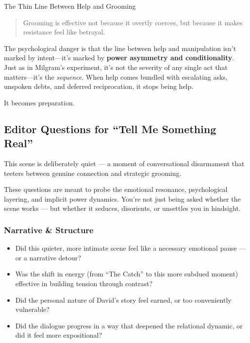 \begin{PsychologicalSidebar}{The Thin Line Between Help and Grooming}
    \begin{quote}
      Grooming is effective not because it overtly coerces, but because it makes resistance feel like betrayal.
    \end{quote}
  
    The psychological danger is that the line between help and manipulation isn’t marked by intent—it’s marked by 
    \textbf{power asymmetry and conditionality}. Just as in Milgram’s experiment, it’s not the severity of any single 
    act that matters—it’s the \textit{sequence}. When help comes bundled with escalating asks, unspoken debts, 
    and deferred reciprocation, it stops being help.
  
    It becomes preparation.
  
  \end{PsychologicalSidebar}
  

\medskip

\subsection*{Editor Questions for ``Tell Me Something Real''}

This scene is deliberately quiet — a moment of conversational disarmament that teeters between genuine connection and 
strategic grooming.

These questions are meant to probe the emotional resonance, psychological layering, and implicit power dynamics.
You're not just being asked whether the scene works — but whether it seduces, disorients, or unsettles you in hindsight.

\subsubsection*{Narrative \& Structure}

\begin{itemize}
\item Did this quieter, more intimate scene feel like a necessary emotional pause — or a narrative detour?
\item Was the shift in energy (from “The Catch” to this more subdued moment) effective in building tension through contrast?
\item Did the personal nature of David’s story feel earned, or too conveniently vulnerable?
\item Did the dialogue progress in a way that deepened the relational dynamic, or did it feel more expositional?
\end{itemize}

